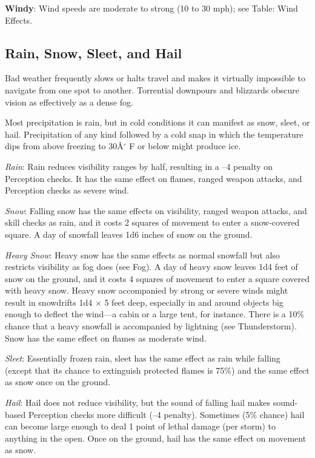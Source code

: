 \textbf{Windy}: Wind speeds are moderate to strong (10 to 30 mph); see Table: Wind Effects.
				
\subsection{Rain, Snow, Sleet, and Hail}

				
Bad weather frequently slows or halts travel and makes it virtually impossible to navigate from one spot to another. Torrential downpours and blizzards obscure vision as effectively as a dense fog.
				
Most precipitation is rain, but in cold conditions it can manifest as snow, sleet, or hail. Precipitation of any kind followed by a cold snap in which the temperature dips from above freezing to 30\^A\mbox{${}^\circ$} F or below might produce ice. 
				
\textit{Rain}: Rain reduces visibility ranges by half, resulting in a --4 penalty on Perception checks. It has the same effect on flames, ranged weapon attacks, and Perception checks as severe wind.
				
\textit{Snow}: Falling snow has the same effects on visibility, ranged weapon attacks, and skill checks as rain, and it costs 2 squares of movement to enter a snow-covered square. A day of snowfall leaves 1d6 inches of snow on the ground.
				
\textit{Heavy Snow}: Heavy snow has the same effects as normal snowfall but also restricts visibility as fog does (see Fog). A day of heavy snow leaves 1d4 feet of snow on the ground, and it costs 4 squares of movement to enter a square covered with heavy snow. Heavy snow accompanied by strong or severe winds might result in snowdrifts 1d4 \mbox{$\times$} 5 feet deep, especially in and around objects big enough to deflect the wind---a cabin or a large tent, for instance. There is a 10\% chance that a heavy snowfall is accompanied by lightning (see Thunderstorm). Snow has the same effect on flames as moderate wind.
				
\textit{Sleet}: Essentially frozen rain, sleet has the same effect as rain while falling (except that its chance to extinguish protected flames is 75\%) and the same effect as snow once on the ground. 
				
\textit{Hail}: Hail does not reduce visibility, but the sound of falling hail makes sound-based Perception checks more difficult (--4 penalty). Sometimes (5\% chance) hail can become large enough to deal 1 point of lethal damage (per storm) to anything in the open. Once on the ground, hail has the same effect on movement as snow.
				
